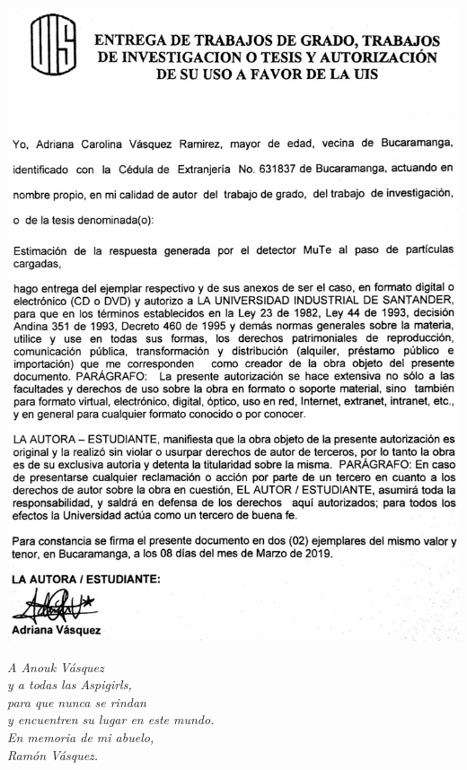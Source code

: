 \documentclass[12pt,oneside,openany,letter]{book}
\begin{document}
\includegraphics[scale=0.9]{carta.png}
\newpage
\begin{flushright}
\vspace{5 cm}
\textit{A Anouk V\'asquez \\
y a todas las Aspigirls,\\
para que nunca se rindan \\
y encuentren su lugar en este mundo.\\
En memoria de mi abuelo,\\
Ram\'on V\'asquez.\\}

\vspace{0.5cm}

\end{flushright}
\end{document}
